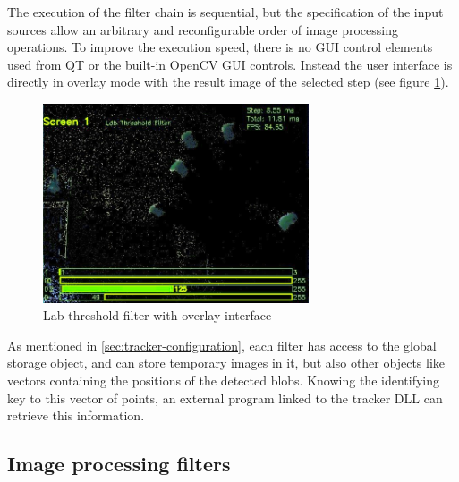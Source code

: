 The execution of the filter chain is sequential, but the specification of the input sources allow an arbitrary and reconfigurable order of image processing operations. 
To improve the execution speed, there is no GUI control elements used from QT or the built-in OpenCV GUI controls. Instead the user interface is directly in overlay mode with the result image of the selected step (see figure \ref{fig:lab-overlay}).

\begin{figure}[H]
\center
\includegraphics[width=0.7\textwidth]{images/step_lab} 
\caption{Lab threshold filter with overlay interface}
\label{fig:lab-overlay}
\end{figure}

As mentioned in \ref{sec:tracker-configuration}, each filter has access to the global storage object, and can store temporary images in it, but also other objects like vectors containing the positions of the detected blobs. Knowing the identifying key to this vector of points, an external program linked to the tracker DLL can retrieve this information.

\subsection{Image processing filters}
\label{sub:image-processing-filters}

